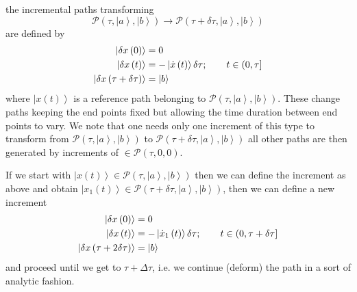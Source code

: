 \documentclass[aps,preprint]{revtex4}
\begin{document}
\begin{description}
\item[$\bullet $] the incremental paths transforming
\begin{equation}
\mathcal{P}\left( \tau ,\left\vert a\right\rangle ,\left\vert b\right\rangle
\right) \rightarrow \mathcal{P}\left( \tau +\delta \tau ,\left\vert
a\right\rangle ,\left\vert b\right\rangle \right)
\end{equation}%
are defined by
\begin{align}
\left\vert \delta x\left( 0\right) \right\rangle & =0  \notag \\
\left\vert \delta x\left( t\right) \right\rangle & =-\left\vert \dot{x}%
\left( t\right) \right\rangle \delta \tau ;\qquad t\in \left( 0,\tau \right]
\notag \\
\left\vert \delta x\left( \tau +\delta \tau \right) \right\rangle &
=\left\vert b\right\rangle
\end{align}%
where $\left\vert x\left( t\right) \right\rangle $ is a reference path
belonging to $\mathcal{P}\left( \tau ,\left\vert a\right\rangle ,\left\vert
b\right\rangle \right) $. These change paths keeping the end points fixed
but allowing the time duration between end points to vary. We note that one
needs only one increment of this type to transform from $\mathcal{P}\left(
\tau ,\left\vert a\right\rangle ,\left\vert b\right\rangle \right) $ to $%
\mathcal{P}\left( \tau +\delta \tau ,\left\vert a\right\rangle ,\left\vert
b\right\rangle \right) $ all other paths are then generated by increments of
$\in \mathcal{P}\left( \tau ,0,0\right) $.

\item If we start with $\left\vert x\left( t\right) \right\rangle \in
\mathcal{P}\left( \tau ,\left\vert a\right\rangle ,\left\vert b\right\rangle
\right) $ then we can define the increment as above and obtain $\left\vert
x_{1}\left( t\right) \right\rangle \in \mathcal{P}\left( \tau +\delta \tau
,\left\vert a\right\rangle ,\left\vert b\right\rangle \right) $, then we can
define a new increment
\begin{align}
\left\vert \delta x\left( 0\right) \right\rangle & =0  \notag \\
\left\vert \delta x\left( t\right) \right\rangle & =-\left\vert \dot{x}%
_{1}\left( t\right) \right\rangle \delta \tau ;\qquad t\in \left( 0,\tau
+\delta \tau \right]  \notag \\
\left\vert \delta x\left( \tau +2\delta \tau \right) \right\rangle &
=\left\vert b\right\rangle
\end{align}%
and proceed until we get to $\tau +\Delta \tau $, i.e. we continue (deform)
the path in a sort of analytic fashion.
\end{description}
\end{document}
